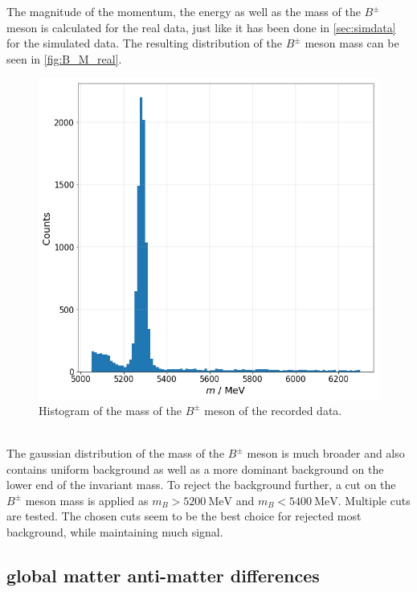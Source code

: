 The magnitude of the momentum, the energy as well as the mass of the $B^{\pm}$ meson is calculated for the real data, just like it has been done in \autoref{sec:simdata} for the simulated data.
The resulting distribution of the $B^{\pm}$ meson mass can be seen in \autoref{fig:B_M_real}.
\begin{figure}
  \centering
  \includegraphics[width = .5\textwidth]{"content/pics/B_M_real.png"}
  \caption{Histogram of the mass of the $B^{\pm}$ meson of the recorded data.}
  \label{fig:B_M_real}
\end{figure}
\\ The gaussian distribution of the mass of the $B^{\pm}$ meson is much broader and also contains uniform background as well as a more dominant background on the lower end of the invariant mass.
To reject the background further, a cut on the $B^{\pm}$ meson mass is applied as $m_B > \qty{5200}{\mega\electronvolt}$ and $m_B < \qty{5400}{\mega\electronvolt}$. Multiple 
cuts are tested. The chosen cuts seem to be the best choice for rejected most background, while maintaining much signal.\\

\subsection{global matter anti-matter differences}

